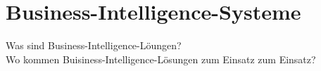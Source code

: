 


\clearpage
\section{Business-Intelligence-Systeme}

Was sind Business-Intelligence-Löungen?\\
Wo kommen Buisiness-Intelligence-Lösungen zum Einsatz zum Einsatz?
